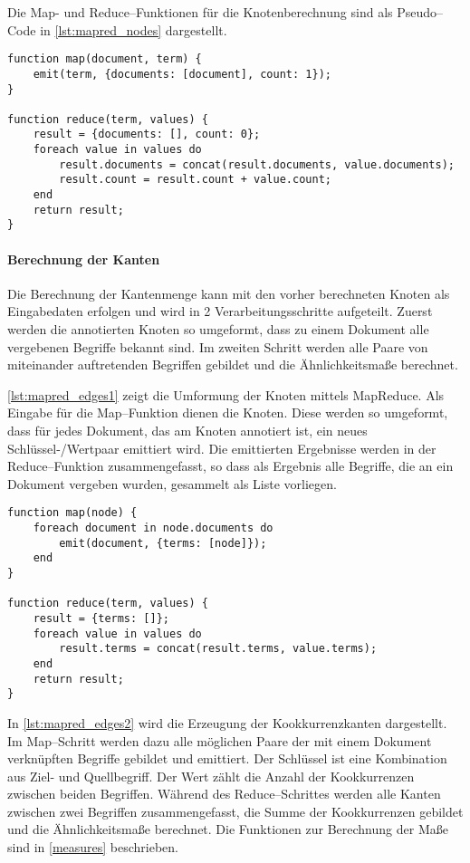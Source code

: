 Die Map- und Reduce--Funktionen für die Knotenberechnung sind als Pseudo--Code in \cref{lst:mapred_nodes} dargestellt.

\begin{lstlisting}[language=pseudo, label={lst:mapred_nodes}, caption={Knotenerzeugung mit MapReduce}, float]
function map(document, term) {
    emit(term, {documents: [document], count: 1});
}

function reduce(term, values) {
    result = {documents: [], count: 0};
    foreach value in values do
        result.documents = concat(result.documents, value.documents);
        result.count = result.count + value.count;
    end
    return result;
}
\end{lstlisting}

\paragraph{Berechnung der Kanten}

Die Berechnung der Kantenmenge kann mit den vorher berechneten Knoten als Eingabedaten erfolgen und wird in 2 Verarbeitungsschritte aufgeteilt. Zuerst werden die annotierten Knoten so umgeformt, dass zu einem Dokument alle vergebenen Begriffe bekannt sind. Im zweiten Schritt werden alle Paare von miteinander auftretenden Begriffen gebildet und die Ähnlichkeitsmaße berechnet.

\cref{lst:mapred_edges1} zeigt die Umformung der Knoten mittels MapReduce. Als Eingabe für die Map--Funktion dienen die Knoten. Diese werden so umgeformt, dass für jedes Dokument, das am Knoten annotiert ist, ein neues Schlüssel-/Wertpaar emittiert wird. Die emittierten Ergebnisse werden in der Reduce--Funktion zusammengefasst, so dass als Ergebnis alle Begriffe, die an ein Dokument vergeben wurden, gesammelt als Liste vorliegen.

\begin{lstlisting}[language=pseudo, label={lst:mapred_edges1}, caption={Umformung der Knoten mit MapReduce}, float=ht]
function map(node) {
    foreach document in node.documents do
        emit(document, {terms: [node]});
    end
}

function reduce(term, values) {
    result = {terms: []};
    foreach value in values do
        result.terms = concat(result.terms, value.terms);
    end
    return result;
}
\end{lstlisting}

In \cref{lst:mapred_edges2} wird die Erzeugung der Kookkurrenzkanten dargestellt. Im Map--Schritt werden dazu alle möglichen Paare der mit einem Dokument verknüpften Begriffe gebildet und emittiert. Der Schlüssel ist eine Kombination aus Ziel- und Quellbegriff. Der Wert zählt die Anzahl der Kookkurrenzen zwischen beiden Begriffen. Während des Reduce--Schrittes werden alle Kanten zwischen zwei Begriffen zusammengefasst, die Summe der Kookkurrenzen gebildet und die Ähnlichkeitsmaße berechnet. Die Funktionen zur Berechnung der Maße sind in \cref{measures} beschrieben.

